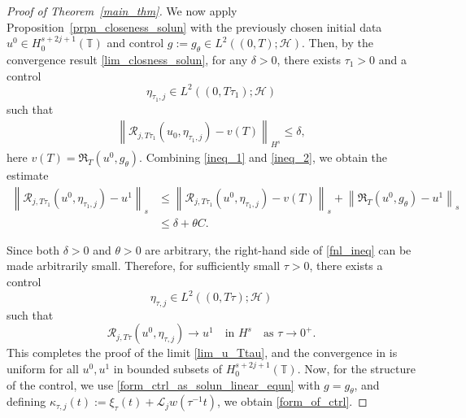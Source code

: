 \documentclass[10pt, reqno]{amsart}
\numberwithin{equation}{section}
\begin{document}
\begin{proof}[Proof of Theorem~\ref{main_thm}]
	
	We now apply Proposition~\ref{prpn_closeness_solun} with the previously chosen initial data \( u^0 \in H^{s + 2j + 1}_0(\mathbb{T}) \) and control \( g := g_{\theta} \in L^2((0, T); \mathcal{H}) \). Then, by the convergence result \eqref{lim_closness_solun}, for any \( \delta > 0 \), there exists \( \tau_1 > 0 \) and a control  
	\[
	\eta_{\tau_1, j} \in L^2((0, T\tau_1); \mathcal{H})
	\]  
	such that  
	\begin{align} \label{ineq_2}
		\left\| \mathcal{R}_{j, T\tau_1}(u_0, \eta_{\tau_1, j}) - v(T) \right\|_{H^s} \leq \delta,
	\end{align}  
	here \( v(T) = \mathfrak{R}_T(u^0, g_\theta) \). Combining \eqref{ineq_1} and \eqref{ineq_2}, we obtain the estimate  
	\begin{align} \label{fnl_ineq}
		\left\| \mathcal{R}_{j, T\tau_1}(u^0, \eta_{\tau_1, j}) - u^1 \right\|_{s}
		&\leq \left\| \mathcal{R}_{j, T\tau_1}(u^0, \eta_{\tau_1, j}) - v(T) \right\|_{s}
		+ \left\| \mathfrak{R}_T(u^0, g_\theta) - u^1 \right\|_{s} \\
		&\leq \delta + \theta C. \nonumber
	\end{align}
	
	Since both \( \delta > 0 \) and \( \theta > 0 \) are arbitrary, the right-hand side of \eqref{fnl_ineq} can be made arbitrarily small. Therefore, for sufficiently small \( \tau > 0 \), there exists a control  
	\[
	\eta_{\tau, j} \in L^2((0, T\tau); \mathcal{H})
	\]  
	such that  
	\[
	\mathcal{R}_{j, T\tau}(u^0, \eta_{\tau, j}) \to u^1 \quad \text{in } H^s \quad \text{as } \tau \to 0^+.
	\]  
	This completes the proof of the limit \eqref{lim_u_Ttau}, and the convergence in  is uniform for all \( u^0, u^1 \) in bounded subsets of \( H^{s + 2j + 1}_0(\mathbb{T}) \). Now, for the structure of the control, we use \eqref{form_ctrl_as_solun_linear_equn} with \( g = g_{\theta} \), and defining $\kappa_{\tau, j} (t):= \xi_{\tau}(t) + \mathcal{L}_jw(\tau^{-1}t)$, we obtain \eqref{form_of_ctrl}.
\end{proof}
\end{document}
